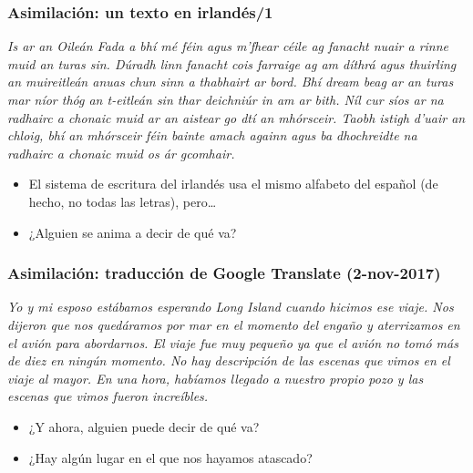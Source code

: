 \documentclass{beamer}
\newcommand{\empha}[1]{\emph{#1}\/}
\begin{document}
\begin{frame}
  \frametitle{Asimilación: un texto en irlandés/1}

  \empha{Is ar an Oileán Fada a bhí mé féin agus m’fhear céile ag fanacht
  nuair a rinne muid an turas sin. Dúradh linn fanacht cois farraige
  ag am díthrá agus thuirling an muireitleán anuas chun sinn a
  thabhairt ar bord. Bhí dream beag ar an turas mar níor thóg an
  t-eitleán sin thar deichniúr in am ar bith. Níl cur síos ar na
  radhairc a chonaic muid ar an aistear go dtí an mhórsceir.  Taobh
  istigh d’uair an chloig, bhí an mhórsceir féin bainte amach againn
  agus ba dhochreidte na radhairc a chonaic muid os ár gcomhair.}
\begin{itemize}
\item El sistema de escritura del irlandés usa el mismo alfabeto del
  español (de hecho, no todas las letras), pero\ldots
\item ¿Alguien se anima a decir de qué va?

\end{itemize}
  \end{frame}
\begin{frame}
  \frametitle{Asimilación: traducción de Google Translate (2-nov-2017)}

  \empha{Yo y mi esposo estábamos esperando Long Island cuando hicimos ese viaje. Nos dijeron que nos quedáramos por mar en el momento del engaño y aterrizamos en el avión para abordarnos. El viaje fue muy pequeño ya que el avión no tomó más de diez en ningún momento. No hay descripción de las escenas que vimos en el viaje al mayor. En una hora, habíamos llegado a nuestro propio pozo y las escenas que vimos fueron increíbles.}
\begin{itemize}
\item ¿Y ahora, alguien puede decir de qué va?
\item ¿Hay algún lugar en el que nos hayamos atascado?
\end{itemize}

\end{frame}
\end{document}
